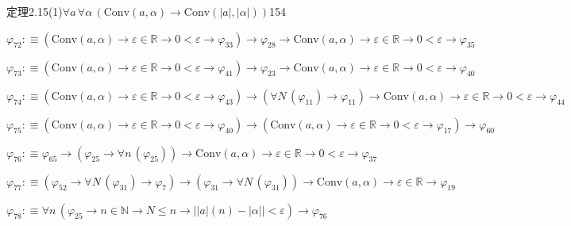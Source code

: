 \begin{fullproof}{定理2.15(1)}{$\forall a\,\forall \alpha\,(\mathrm{Conv}(a,\alpha) \to \mathrm{Conv}(\lvert a \rvert,\lvert \alpha \rvert))$}{154}
\begin{abbrevlist}
\item $\varphi_{72} :\equiv (\mathrm{Conv}(a,\alpha) \to \varepsilon \in \mathbb{R} \to 0 < \varepsilon \to \varphi_{33}) \to \varphi_{28} \to \mathrm{Conv}(a,\alpha) \to \varepsilon \in \mathbb{R} \to 0 < \varepsilon \to \varphi_{35}$
\item $\varphi_{73} :\equiv (\mathrm{Conv}(a,\alpha) \to \varepsilon \in \mathbb{R} \to 0 < \varepsilon \to \varphi_{41}) \to \varphi_{23} \to \mathrm{Conv}(a,\alpha) \to \varepsilon \in \mathbb{R} \to 0 < \varepsilon \to \varphi_{40}$
\item $\varphi_{74} :\equiv (\mathrm{Conv}(a,\alpha) \to \varepsilon \in \mathbb{R} \to 0 < \varepsilon \to \varphi_{43}) \to (\forall N\,(\varphi_{11}) \to \varphi_{11}) \to \mathrm{Conv}(a,\alpha) \to \varepsilon \in \mathbb{R} \to 0 < \varepsilon \to \varphi_{44}$
\item $\varphi_{75} :\equiv (\mathrm{Conv}(a,\alpha) \to \varepsilon \in \mathbb{R} \to 0 < \varepsilon \to \varphi_{40}) \to (\mathrm{Conv}(a,\alpha) \to \varepsilon \in \mathbb{R} \to 0 < \varepsilon \to \varphi_{17}) \to \varphi_{60}$
\item $\varphi_{76} :\equiv \varphi_{65} \to (\varphi_{25} \to \forall n\,(\varphi_{25})) \to \mathrm{Conv}(a,\alpha) \to \varepsilon \in \mathbb{R} \to 0 < \varepsilon \to \varphi_{37}$
\item $\varphi_{77} :\equiv (\varphi_{52} \to \forall N\,(\varphi_{31}) \to \varphi_{7}) \to (\varphi_{31} \to \forall N\,(\varphi_{31})) \to \mathrm{Conv}(a,\alpha) \to \varepsilon \in \mathbb{R} \to \varphi_{19}$
\item $\varphi_{78} :\equiv \forall n\,(\varphi_{25} \to n \in \mathbb{N} \to N \leq n \to \lvert \lvert a \rvert(n) - \lvert \alpha \rvert \rvert < \varepsilon) \to \varphi_{76}$
\end{abbrevlist}
\end{fullproof}
